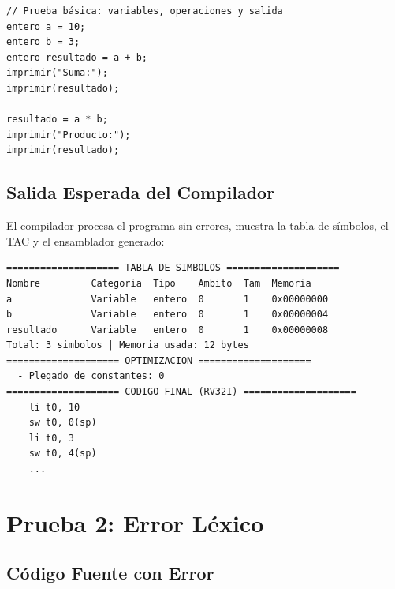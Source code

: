 \begin{lstlisting}[style=tppstyle, caption={Programa correcto: operaciones básicas}]
// Prueba básica: variables, operaciones y salida
entero a = 10;
entero b = 3;
entero resultado = a + b;
imprimir("Suma:");
imprimir(resultado);

resultado = a * b;
imprimir("Producto:");
imprimir(resultado);
\end{lstlisting}

\subsection{Salida Esperada del Compilador}

El compilador procesa el programa sin errores, muestra la tabla de símbolos, el TAC y el ensamblador generado:

\begin{verbatim}
==================== TABLA DE SIMBOLOS ====================
Nombre         Categoria  Tipo    Ambito  Tam  Memoria
a              Variable   entero  0       1    0x00000000
b              Variable   entero  0       1    0x00000004
resultado      Variable   entero  0       1    0x00000008
Total: 3 simbolos | Memoria usada: 12 bytes
==================== OPTIMIZACION ====================
  - Plegado de constantes: 0
==================== CODIGO FINAL (RV32I) ====================
    li t0, 10
    sw t0, 0(sp)
    li t0, 3
    sw t0, 4(sp)
    ...
\end{verbatim}


\section{Prueba 2: Error Léxico}

\subsection{Código Fuente con Error}

